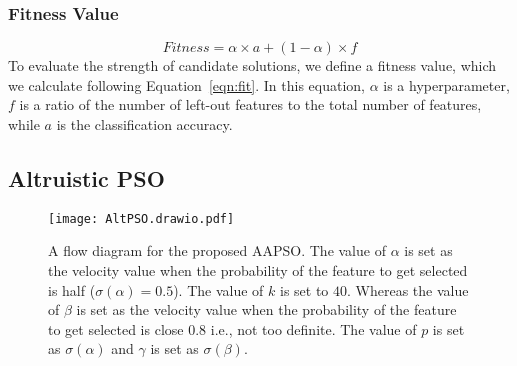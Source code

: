 \documentclass[final,3p,times]{elsarticle}
\begin{document}
\subsubsection{Fitness Value}
\begin{equation}
    \label{eqn:fit}
    Fitness=\alpha \times a + (1-\alpha)\times f
\end{equation}
To evaluate the strength of candidate solutions, we define a fitness value,{ which we calculate} following Equation~\ref{eqn:fit}. In this equation, $\alpha$ is a hyperparameter, $f$ is a ratio of the number of left-out features to the total number of {features,} while $a$ is the classification accuracy. \subsection{Altruistic PSO}
\begin{figure}[ht!]
    \centering
    \texttt{[image: AltPSO.drawio.pdf]}
    \caption{A flow diagram for the proposed AAPSO. The value of $\alpha$ is set as the velocity value when the probability of the feature to get selected is half ($\sigma(\alpha)=0.5$). The value of $k$ is set to $40$. Whereas the value of $\beta$ is set as the velocity value when the probability of the feature to get selected is close $0.8$ i.e., not too definite. The value of $p$ is set as $\sigma(\alpha)$ and $\gamma$ is set as $\sigma(\beta)$.}
    \label{fig:altpso}
\end{figure}
\end{document}
